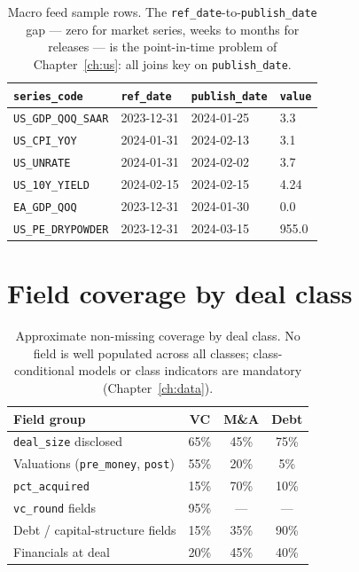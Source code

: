 \begin{table}[htbp]
\centering
\small
\begin{tabular}{llll}
\toprule
\texttt{series\_code} & \texttt{ref\_date} & \texttt{publish\_date} & \texttt{value} \\
\midrule
\texttt{US\_GDP\_QOQ\_SAAR} & 2023-12-31 & 2024-01-25 & 3.3 \\
\texttt{US\_CPI\_YOY} & 2024-01-31 & 2024-02-13 & 3.1 \\
\texttt{US\_UNRATE} & 2024-01-31 & 2024-02-02 & 3.7 \\
\texttt{US\_10Y\_YIELD} & 2024-02-15 & 2024-02-15 & 4.24 \\
\texttt{EA\_GDP\_QOQ} & 2023-12-31 & 2024-01-30 & 0.0 \\
\texttt{US\_PE\_DRYPOWDER} & 2023-12-31 & 2024-03-15 & 955.0 \\
\bottomrule
\end{tabular}
\caption{Macro feed sample rows. The \texttt{ref\_date}-to-\texttt{publish\_date} gap --- zero for market
series, weeks to months for releases --- is the point-in-time problem of Chapter~\ref{ch:us}: all joins
key on \texttt{publish\_date}.}
\label{tab:app-macro}
\end{table}

\section{Field coverage by deal class}\label{app:schema-coverage}

\begin{table}[htbp]
\centering
\small
\begin{tabular}{lccc}
\toprule
Field group & VC & M\&A & Debt \\
\midrule
\texttt{deal\_size} disclosed & 65\% & 45\% & 75\% \\
Valuations (\texttt{pre\_money}, \texttt{post}) & 55\% & 20\% & 5\% \\
\texttt{pct\_acquired} & 15\% & 70\% & 10\% \\
\texttt{vc\_round} fields & 95\% & --- & --- \\
Debt / capital-structure fields & 15\% & 35\% & 90\% \\
Financials at deal & 20\% & 45\% & 40\% \\
\bottomrule
\end{tabular}
\caption{Approximate non-missing coverage by deal class. No field is well populated across all classes;
class-conditional models or class indicators are mandatory (Chapter~\ref{ch:data}).}
\label{tab:app-coverage}
\end{table}

